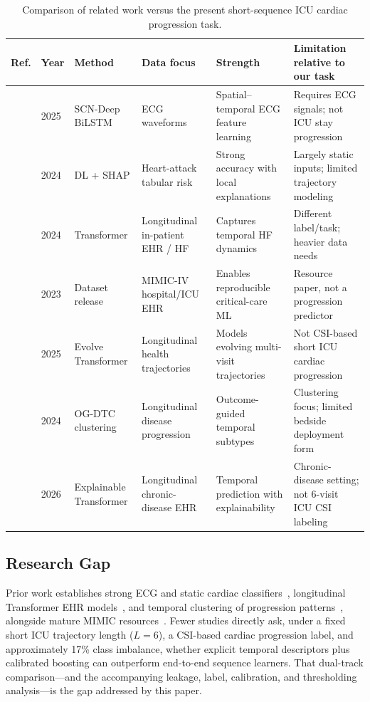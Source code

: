 \documentclass[conference]{IEEEtran}
\begin{document}
\begin{table}[!t]
\caption{Comparison of related work versus the present short-sequence ICU cardiac progression task.}
\label{tab:lit-compare}
\centering
\scriptsize
\setlength{\tabcolsep}{2.8pt}
\begin{tabular}{lp{1.35cm}p{2.2cm}p{2.4cm}p{2.6cm}p{3.0cm}}
\toprule
Ref. & Year & Method & Data focus & Strength & Limitation relative to our task \\
\midrule
\cite{pandey2025scn} & 2025 & SCN-Deep BiLSTM & ECG waveforms & Spatial--temporal ECG feature learning & Requires ECG signals; not ICU stay progression \\
\cite{dritsas2024heartattack} & 2024 & DL + SHAP & Heart-attack tabular risk & Strong accuracy with local explanations & Largely static inputs; limited trajectory modeling \\
\cite{drozdov2024transformer} & 2024 & Transformer & Longitudinal in-patient EHR / HF & Captures temporal HF dynamics & Different label/task; heavier data needs \\
\cite{johnson2023mimic} & 2023 & Dataset release & MIMIC-IV hospital/ICU EHR & Enables reproducible critical-care ML & Resource paper, not a progression predictor \\
\cite{moen2025evolve} & 2025 & Evolve Transformer & Longitudinal health trajectories & Models evolving multi-visit trajectories & Not CSI-based short ICU cardiac progression \\
\cite{wang2024ogdtc} & 2024 & OG-DTC clustering & Longitudinal disease progression & Outcome-guided temporal subtypes & Clustering focus; limited bedside deployment form \\
\cite{zangana2026explainable} & 2026 & Explainable Transformer & Longitudinal chronic-disease EHR & Temporal prediction with explainability & Chronic-disease setting; not 6-visit ICU CSI labeling \\
\bottomrule
\end{tabular}
\end{table}

\subsection{Research Gap}
Prior work establishes strong ECG and static cardiac classifiers~\cite{pandey2025scn,dritsas2024heartattack}, longitudinal Transformer EHR models~\cite{drozdov2024transformer,moen2025evolve,zangana2026explainable}, and temporal clustering of progression patterns~\cite{wang2024ogdtc}, alongside mature MIMIC resources~\cite{johnson2023mimic}. Fewer studies directly ask, under a fixed short ICU trajectory length ($L=6$), a CSI-based cardiac progression label, and approximately 17\% class imbalance, whether explicit temporal descriptors plus calibrated boosting can outperform end-to-end sequence learners. That dual-track comparison---and the accompanying leakage, label, calibration, and thresholding analysis---is the gap addressed by this paper.
\end{document}
